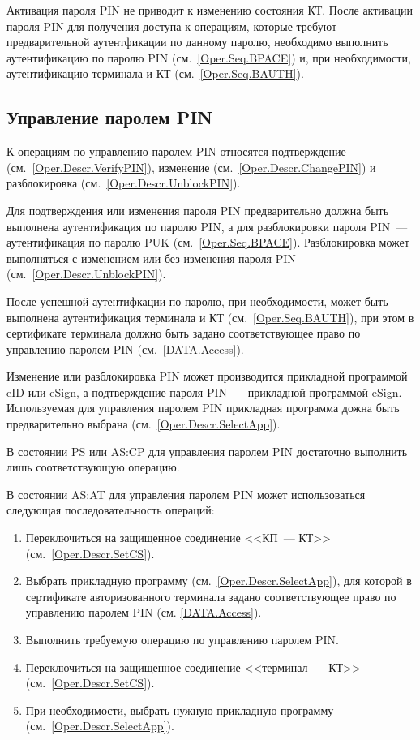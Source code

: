 Активация пароля PIN не приводит к изменению состояния КТ.
После активации пароля PIN для получения доступа к
операциям, которые требуют предварительной
аутентфикации по данному паролю, необходимо выполнить аутентификацию 
по паролю PIN (см.~\ref{Oper.Seq.BPACE}) и, при необходимости, 
аутентификацию терминала и КТ (см.~\ref{Oper.Seq.BAUTH}).

\subsection{Управление паролем PIN}
\label{Oper.Seq.ControlPIN}

К операциям по управлению паролем PIN относятся
подтверждение (см.~\ref{Oper.Descr.VerifyPIN}),
изменение (см.~\ref{Oper.Descr.ChangePIN}) и
разблокировка (см.~\ref{Oper.Descr.UnblockPIN}).

Для подтверждения или изменения пароля PIN предварительно 
должна быть выполнена аутентификация по 
паролю PIN, а для разблокировки пароля PIN~---
аутентификация по паролю PUK (см.~\ref{Oper.Seq.BPACE}).
Разблокировка может выполняться с изменением или без 
изменения пароля PIN (см.~\ref{Oper.Descr.UnblockPIN}).

После успешной аутентифкации по паролю,
при необходимости, может быть выполнена аутентификация 
терминала и КТ (см.~\ref{Oper.Seq.BAUTH}),
при этом в сертификате терминала должно быть задано соответствующее 
право по управлению паролем PIN (см.~\ref{DATA.Access}).

Изменение или разблокировка PIN может
производится прикладной программой eID или eSign,
а подтверждение пароля PIN~--- прикладной программой eSign.
Используемая для управления паролем PIN прикладная
программа дожна быть предварительно 
выбрана (см.~\ref{Oper.Descr.SelectApp}). 

В состоянии PS или AS:CP для управления паролем PIN
достаточно выполнить лишь соответствующую операцию.

В состоянии AS:AT для управления паролем PIN может
использоваться следующая последовательность операций:
%
\begin{enumerate} 
\item Переключиться на защищенное соединение <<КП~--- КТ>> 
      (см.~\ref{Oper.Descr.SetCS}).
\item Выбрать прикладную программу (см.~\ref{Oper.Descr.SelectApp}),
      для которой в сертификате авторизованного терминала задано 
      соответствующее право по управлению паролем PIN (см. \ref{DATA.Access}).
\item Выполнить требуемую операцию по управлению паролем PIN.
\item Переключиться на защищенное соединение <<терминал~--- КТ>> 
      (см.~\ref{Oper.Descr.SetCS}).
\item При необходимости, выбрать нужную прикладную программу 
      (см.~\ref{Oper.Descr.SelectApp}).
\end{enumerate}


